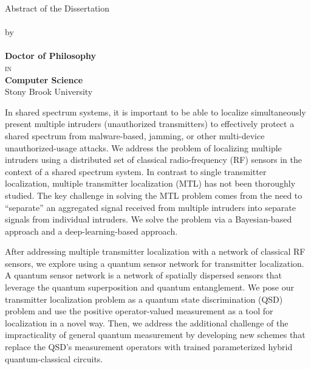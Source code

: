 \begin{center}
    Abstract of the Dissertation  \\
    \vspace{0.25cm}
    \textbf{\ttitle}  \\
    \vspace{0.25cm}
    by    \\
    \vspace{0.25cm}
    \textbf{\authorname}  \\
    \vspace{0.25cm}
    \textbf{Doctor of Philosophy}  \\
    \vspace{0.25cm}
    \textsc{in}  \\
    \vspace{0.25cm}
    \textbf{Computer Science}   \\
    \vspace{0.25cm}
    Stony Brook University    \\
\end{center}

In shared spectrum systems, it is important to be able to localize simultaneously present multiple intruders 
(unauthorized transmitters) to effectively protect a shared spectrum from malware-based, jamming, 
or other multi-device unauthorized-usage attacks. We address the problem of localizing multiple intruders using 
a distributed set of classical radio-frequency (RF) sensors in the context of a shared spectrum system. 
In contrast to single transmitter localization, multiple transmitter localization (MTL) has not been thoroughly studied. 
The key challenge in solving the MTL problem comes from the need to “separate” an aggregated signal received from 
multiple intruders into separate signals from individual intruders. We solve the problem via a Bayesian-based approach 
and a deep-learning-based approach. 

After addressing multiple transmitter localization with a network of classical RF sensors, 
we explore using a quantum sensor network for transmitter localization. 
A quantum sensor network is a network of spatially dispersed sensors that leverage the quantum superposition and quantum entanglement. We pose our transmitter localization problem as 
a quantum state discrimination (QSD) problem and use the positive operator-valued measurement as a tool 
for localization in a novel way. Then, we address the additional challenge of the impracticality 
of general quantum measurement by developing new schemes that replace the QSD's measurement operators 
with trained parameterized hybrid quantum-classical circuits. 

